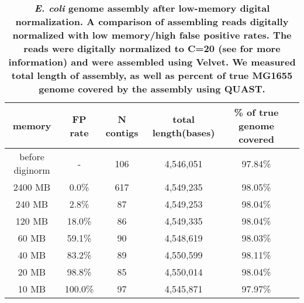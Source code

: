 \begin{table}[!ht]
\caption{
\bf{{\em E. coli} genome assembly after low-memory digital normalization.
  A comparison of assembling reads digitally normalized with low memory/high
  false positive rates.  The reads were digitally normalized to 
  C=20 (see
  \cite{Brown2012} for more information) and were assembled using Velvet.
  We measured total length of assembly,
  as well as percent of true MG1655 genome covered by the assembly using QUAST.}}
\begin{tabular}{ | c | c | c | c | c | c |}
\hline
memory   & FP rate & N contigs & total length(bases) & \% of true genome covered \\
\hline
before diginorm  &-   & 106 & 4,546,051 & 97.84\% \\
    2400 MB  &  0.0\% & 617 & 4,549,235 & 98.05\% \\
     240 MB  &  2.8\% &  87 & 4,549,253 & 98.04\% \\
     120 MB  & 18.0\% &  86 & 4,549,335 & 98.04\% \\
      60 MB  & 59.1\% &  90 & 4,548,619 & 98.03\% \\
      40 MB  & 83.2\% &  89 & 4,550,599 & 98.11\% \\
      20 MB  & 98.8\% &  85 & 4,550,014 & 98.04\% \\
      10 MB  &100.0\% &  97 & 4,545,871 & 97.97\% \\
\end{tabular}
\begin{flushleft}
\end{flushleft}
\label{table:assembly}
\end{table}

